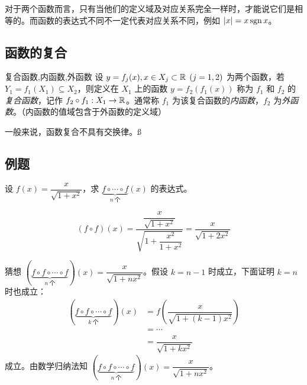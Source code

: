 对于两个函数而言，只有当他们的定义域及对应关系完全一样时，才能说它们是相等的。而函数的表达式不同不一定代表对应关系不同，例如 $|x| = x \mathop{\mathrm{sgn}} x$。

\subsection{函数的复合}

\begin{definition}{复合函数,内函数,外函数}
	设 $y = f_j(x), x \in X_j \subset \mathbb R \pod{j = 1, 2}$ 为两个函数，若 $Y_1 = f_1(X_1) \subseteq X_2$，则定义在 $X_1$ 上的函数 $y = f_2(f_1(x))$ 称为 $f_1$ 和 $f_2$ 的\emph{复合函数}，记作 $f_2 \circ f_1: X_1 \rightarrow \mathbb R$。通常称 $f_1$ 为该复合函数的\emph{内函数}，$f_2$ 为\emph{外函数}。（内函数的值域包含于外函数的定义域）
\end{definition}

一般来说，函数复合不具有交换律。ß

\subsection{例题}

设 $f(x) = \dfrac{x}{\sqrt{1 + x^2}}$，求 $\underset{n ~\text{个}}{\underbrace{f \circ \cdots \circ f}}(x)$ 的表达式。

\begin{solve}
	$$
	(f \circ f)(x) = \dfrac{\dfrac{x}{\sqrt{1 + x^2}}}{\sqrt{1 + \dfrac{x^2}{1 + x^2}}} = \dfrac{x}{\sqrt{1 + 2x^2}}
	$$

	猜想 $(\underset{n ~\text{个}}{\underbrace{f \circ f \circ \cdots \circ f}})(x) = \dfrac{x}{\sqrt{1 + nx^2}}$。假设 $k = n - 1$ 时成立，下面证明 $k = n$ 时也成立：
	$$
	\begin{aligned}
		(\underset{k ~\text{个}}{\underbrace{f \circ f \circ \cdots \circ f}})(x) &= f \left( \dfrac{x}{\sqrt{1 + (k - 1) x^2}} \right)
		\\&=\cdots
		\\&=
		\dfrac{x}{\sqrt{1 + kx^2}}
	\end{aligned}
	$$
	成立。由数学归纳法知 $(\underset{n ~\text{个}}{\underbrace{f \circ f \circ \cdots \circ f}})(x) = \dfrac{x}{\sqrt{1 + nx^2}}$。
\end{solve}